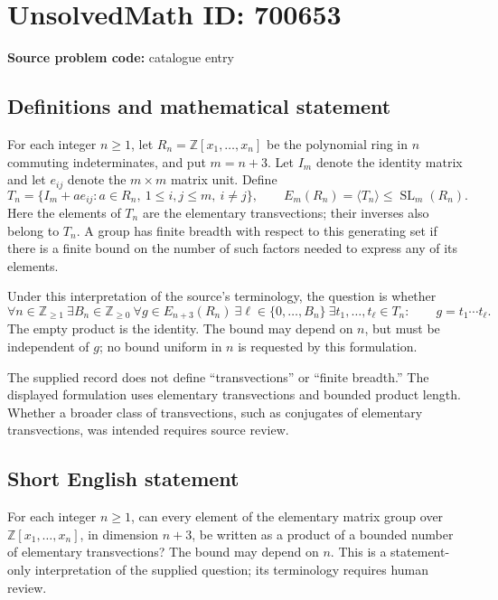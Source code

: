 \documentclass[11pt]{article}
\newcommand{\Z}{\mathbb{Z}}
\begin{document}
\section*{UnsolvedMath ID: 700653}
\textbf{Source problem code:} catalogue entry
\subsection{Definitions and mathematical statement}
For each integer \(n\geq 1\), let \(R_n=\Z[x_1,\ldots,x_n]\) be the polynomial ring in \(n\) commuting indeterminates, and put \(m=n+3\). Let \(I_m\) denote the identity matrix and let \(e_{ij}\) denote the \(m\times m\) matrix unit. Define
\[
T_n=\{I_m+a e_{ij}:a\in R_n,\ 1\leq i,j\leq m,\ i\neq j\},
\qquad E_m(R_n)=\langle T_n\rangle\leq\operatorname{SL}_m(R_n).
\]
Here the elements of \(T_n\) are the elementary transvections; their inverses also belong to \(T_n\). A group has finite breadth with respect to this generating set if there is a finite bound on the number of such factors needed to express any of its elements.

Under this interpretation of the source's terminology, the question is whether
\[
\forall n\in\Z_{\geq 1}\ \exists B_n\in\Z_{\geq 0}\ \forall g\in E_{n+3}(R_n)\ \exists \ell\in\{0,\ldots,B_n\}\ \exists t_1,\ldots,t_\ell\in T_n:
\qquad g=t_1\cdots t_\ell.
\]
The empty product is the identity. The bound may depend on \(n\), but must be independent of \(g\); no bound uniform in \(n\) is requested by this formulation.

The supplied record does not define ``transvections'' or ``finite breadth.'' The displayed formulation uses elementary transvections and bounded product length. Whether a broader class of transvections, such as conjugates of elementary transvections, was intended requires source review.
\subsection{Short English statement}
For each integer \(n\geq 1\), can every element of the elementary matrix group over \(\Z[x_1,\ldots,x_n]\), in dimension \(n+3\), be written as a product of a bounded number of elementary transvections? The bound may depend on \(n\). This is a statement-only interpretation of the supplied question; its terminology requires human review.
\end{document}
